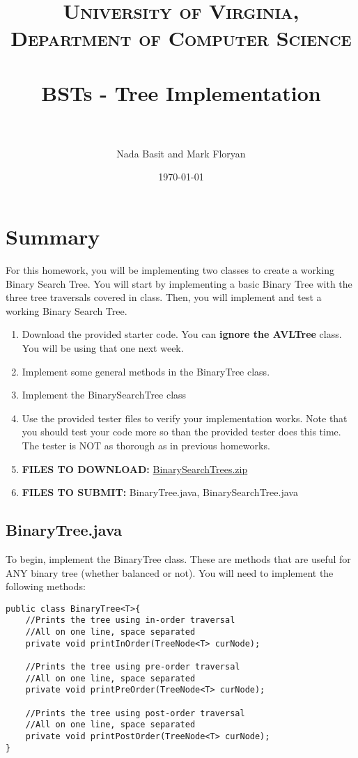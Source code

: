 \documentclass[paper=a4, fontsize=11pt, parskip=full]{scrartcl} %
\title{
\normalfont \normalsize
\textsc{University of Virginia, Department of Computer Science} \\ [25pt] %
\horrule{0.5pt} \\[0.4cm] %
\huge BSTs - Tree Implementation \\ %
\horrule{2pt} \\[0.5cm] %
}
\author{Nada Basit and Mark Floryan}
\date{\normalsize\today} %
\numberwithin{equation}{section} %
\numberwithin{figure}{section} %
\numberwithin{table}{section} %
\begin{document}
\maketitle %


\section{Summary}

For this homework, you will be implementing two classes to create a working Binary Search Tree. You will start by implementing a basic Binary Tree with the three tree traversals covered in class. Then, you will implement and test a working Binary Search Tree.

\begin{enumerate}
	\item Download the provided starter code. You can \textbf{ignore the AVLTree} class. You will be using that one next week.
	\item Implement some general methods in the BinaryTree class.
	\item Implement the BinarySearchTree class
	\item Use the provided tester files to verify your implementation works. Note that you should test your code more so than the provided tester does this time. The tester is NOT as thorough as in previous homeworks.
	\item \textbf{FILES TO DOWNLOAD:} \href{https://uva-cs.github.io/dsa1/homeworks/BinarySearchTrees/code/BinarySearchTrees.zip}{BinarySearchTrees.zip}
	\item \textbf{FILES TO SUBMIT:} BinaryTree.java, BinarySearchTree.java
\end{enumerate}


\subsection{BinaryTree.java}

To begin, implement the BinaryTree class. These are methods that are useful for ANY binary tree (whether balanced or not). You will need to implement the following methods:

\begin{lstlisting}
public class BinaryTree<T>{
	//Prints the tree using in-order traversal
	//All on one line, space separated
	private void printInOrder(TreeNode<T> curNode);
	
	//Prints the tree using pre-order traversal
	//All on one line, space separated
	private void printPreOrder(TreeNode<T> curNode);
	
	//Prints the tree using post-order traversal
	//All on one line, space separated
	private void printPostOrder(TreeNode<T> curNode);
}
\end{lstlisting}
\end{document}
